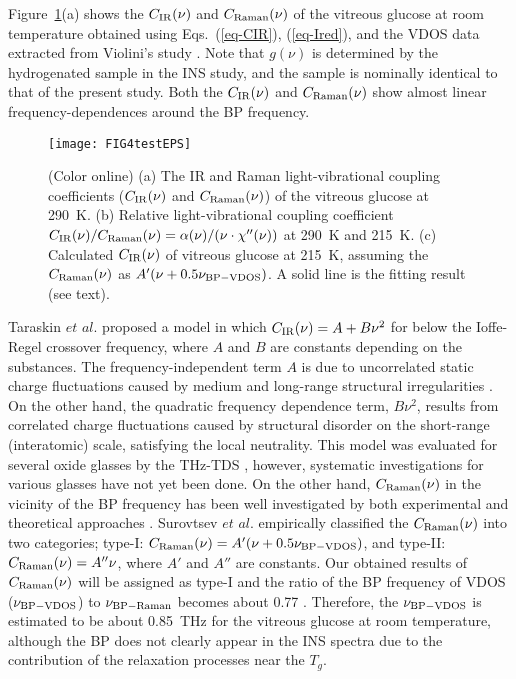 \documentclass[%
 reprint,
superscriptaddress,
 amsmath,amssymb,
 aps,
prb,
]{revtex4-1}
\begin{document}
Figure~\ref{fig4}(a) shows the $C_{\rm IR}(\nu)$ and $C_{\rm Raman}(\nu)$ of the vitreous glucose at room temperature obtained using Eqs.~(\ref{eq-CIR}), (\ref{eq-Ired}), and the VDOS data extracted from Violini's study \cite{Violini2012}.
Note that $g(\nu)$ is determined by the hydrogenated sample in the INS study\cite{Violini2012}, and the sample is nominally identical to that of the present study. 
Both the $C_{\rm IR}(\nu)$ and $C_{\rm Raman}(\nu)$ show almost linear frequency-dependences around the BP frequency.

\begin{figure}
\texttt{[image: FIG4testEPS]}
\caption{(Color online) (a) The IR and Raman light-vibrational coupling coefficients ($C_{\rm IR}(\nu)$ and $C_{\rm Raman}(\nu)$) of the vitreous glucose at 290~K. (b) Relative light-vibrational coupling coefficient  $C_{\rm IR}(\nu)/C_{\rm Raman}(\nu) = \alpha(\nu)/(\nu \cdot \chi''(\nu))$ at 290~K and 215~K. (c) Calculated $C_{\rm IR}(\nu)$ of vitreous glucose at 215~K, assuming the $C_{\rm Raman}(\nu)$ as $A'(\nu+0.5\nu_{\rm BP-VDOS})$. A solid line is the fitting result (see text).}
\label{fig4}
\end{figure}

Taraskin $et$ $al$. proposed a model \cite{Taraskin2006} in which $C_{\rm IR}(\nu) = A + B\nu^{2}$ for below the Ioffe-Regel crossover frequency, where $A$ and $B$ are constants depending on the substances.
The frequency-independent term $A$ is due to uncorrelated static charge fluctuations caused by medium and long-range structural irregularities \cite{Taraskin2006}.
On the other hand, the quadratic frequency dependence term, $B\nu^{2}$, results from correlated charge fluctuations caused by structural disorder on the short-range (interatomic) scale, satisfying the local neutrality\cite{Taraskin2006}.
This model was evaluated for several oxide glasses by the THz-TDS \cite{Taraskin2006,Parrott2010}, however, systematic investigations for various glasses have not yet been done.
On the other hand, $C_{\rm Raman}(\nu)$ in the vicinity of the BP frequency has been well investigated  by both experimental and theoretical approaches \cite{Shuker1970, Duval1990, Duval1993, Surovtsev2002}.
Surovtsev $et$ $al$. \cite{Surovtsev2002} empirically classified the $C_{\rm Raman}(\nu)$ into two categories; type-I: $C_{\rm Raman}(\nu)=A'(\nu+0.5\nu_{\rm BP-VDOS})$, and type-II: $C_{\rm Raman}(\nu)=A''\nu$, where $A'$ and $A''$ are constants. Our obtained results of $C_{\rm Raman}(\nu)$ will be assigned as type-I and the ratio of the BP frequency of VDOS ($\nu_{\rm BP-VDOS}$) to $\nu_{\rm BP-Raman}$ becomes about 0.77 \cite{Surovtsev2002, Nakamura2015}. Therefore, the $\nu_{\rm BP-VDOS}$ is estimated to be about 0.85~THz for the vitreous glucose at room temperature, although the BP does not clearly appear in the INS spectra \cite{Violini2012} due to the contribution of the relaxation processes near the $T_{g}$.
\end{document}
